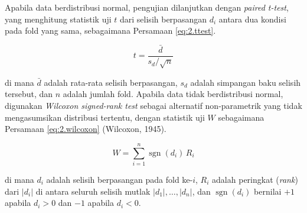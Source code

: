 Apabila data berdistribusi normal, pengujian dilanjutkan dengan
\emph{paired t-test}, yang menghitung statistik uji $t$ dari selisih
berpasangan $d_i$ antara dua kondisi pada fold yang sama, sebagaimana
Persamaan \ref{eq:2.ttest}.

\begin{equation}
  t = \frac{\bar{d}}{s_d / \sqrt{n}}
  \label{eq:2.ttest}
\end{equation}

\noindent
di mana $\bar{d}$ adalah rata-rata selisih berpasangan, $s_d$ adalah
simpangan baku selisih tersebut, dan $n$ adalah jumlah fold. Apabila
data tidak berdistribusi normal, digunakan \emph{Wilcoxon signed-rank
test} sebagai alternatif non-parametrik yang tidak mengasumsikan
distribusi tertentu, dengan statistik uji $W$ sebagaimana Persamaan
\ref{eq:2.wilcoxon} (Wilcoxon, 1945).

\begin{equation}
  W = \sum_{i=1}^{n} \operatorname{sgn}(d_i) \, R_i
  \label{eq:2.wilcoxon}
\end{equation}

\noindent
di mana $d_i$ adalah selisih berpasangan pada fold ke-$i$, $R_i$ adalah
peringkat (\emph{rank}) dari $|d_i|$ di antara seluruh selisih mutlak
$|d_1|, \dots, |d_n|$, dan $\operatorname{sgn}(d_i)$ bernilai $+1$
apabila $d_i>0$ dan $-1$ apabila $d_i<0$.
